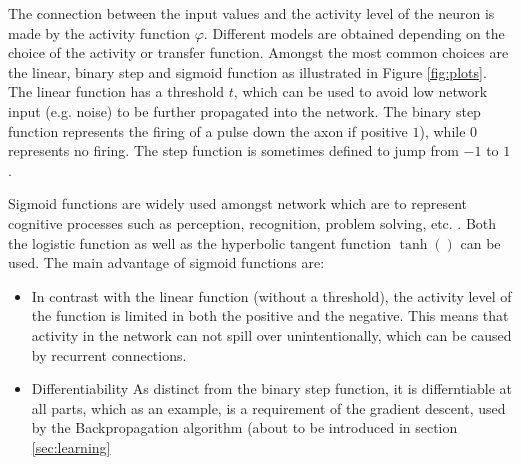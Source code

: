 \documentclass[10pt,a4paper,DIV=11]{scrreprt}
\begin{document}
The connection between the input values and the activity level of the neuron is made by the activity function $\varphi$. Different models are obtained depending on the choice of the activity or transfer function. Amongst the most common choices are the linear, binary step and sigmoid function as illustrated in Figure \ref{fig:plots}. The linear function has a threshold $t$, which can be used to avoid low network input (e.g. noise) to be further propagated into the network. The binary step function represents the firing of a pulse down the axon if positive $1$), while $0$ represents no firing. The step function is sometimes defined to jump from $-1$ to $1$. 

Sigmoid functions are widely used amongst network which are to represent cognitive processes such as perception, recognition, problem solving, etc. .
Both the logistic function as well as the hyperbolic tangent function $\tanh()$ can be used. The main advantage of sigmoid functions are:

\begin{itemize}
\item In contrast with the linear function (without a threshold), the activity level of the function is limited in both the positive and the negative. This means that activity in the network can not spill over unintentionally, which can be caused by recurrent connections.
\item Differentiability
As distinct from the binary step function, it is differntiable at all parts, which as an example, is a requirement of the gradient descent, used by the Backpropagation algorithm (about to be introduced in section \ref{sec:learning}
\end{itemize}
\end{document}
